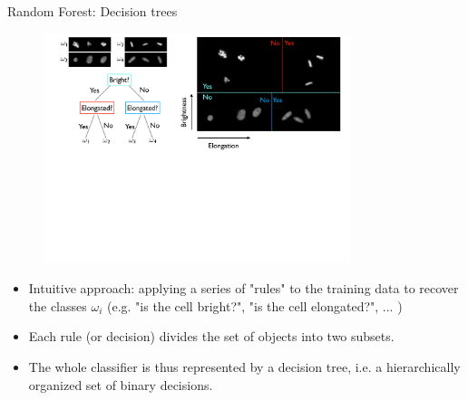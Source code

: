 \documentclass[xcolor=pdftex,dvipsnames,table]{beamer}
\begin{document}
\begin{frame}{Random Forest: Decision trees}
\begin{figure}[htb]
\includegraphics[width=0.8\textwidth]{../graphics/CellClassification_RF.pdf}
\end{figure}

\begin{itemize}
	\item Intuitive approach: applying a series of "rules" to the training data to recover the classes $\omega_i$ (e.g. "is the cell bright?", "is the cell elongated?", ... ) 	
	\item Each rule (or decision) divides the set of objects into two subsets. 
	\item The whole classifier is thus represented by a decision tree, i.e. a hierarchically organized set of binary decisions.
\end{itemize}
\end{frame}
\end{document}
